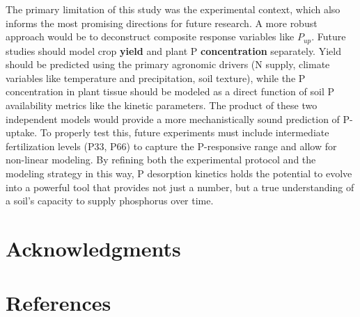 \documentclass[
  a4paper,
]{article}
\begin{document}
The primary limitation of this study was the experimental context, which
also informs the most promising directions for future research. A more
robust approach would be to deconstruct composite response variables
like \(P_{up}\). Future studies should model crop \textbf{yield} and
plant P \textbf{concentration} separately. Yield should be predicted
using the primary agronomic drivers (N supply, climate variables like
temperature and precipitation, soil texture), while the P concentration
in plant tissue should be modeled as a direct function of soil P
availability metrics like the kinetic parameters. The product of these
two independent models would provide a more mechanistically sound
prediction of P-uptake. To properly test this, future experiments must
include intermediate fertilization levels (P33, P66) to capture the
P-responsive range and allow for non-linear modeling. By refining both
the experimental protocol and the modeling strategy in this way, P
desorption kinetics holds the potential to evolve into a powerful tool
that provides not just a number, but a true understanding of a soil's
capacity to supply phosphorus over time.

\section{Acknowledgments}\label{acknowledgments}

\newpage

\section{References}\label{references}
\end{document}
